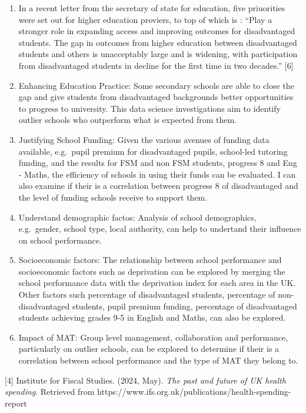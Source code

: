 \documentclass[
  letterpaper,
  DIV=11,
  numbers=noendperiod]{scrartcl}
\begin{document}
\begin{enumerate}
\def\labelenumi{\arabic{enumi}.}
\item
  In a recent letter from the secretary of state for education, five
  priuorities were set out for higher education proviers, to top of
  which is : ``Play a stronger role in expanding access and improving
  outcomes for disadvantaged students. The gap in outcomes from higher
  education between disadvantaged students and others is unacceptably
  large and is widening, with participation from disadvantaged students
  in decline for the first time in two decades.'' {[}6{]}
\item
  Enhancing Education Practice: Some secondary schools are able to close
  the gap and give students from disadvantaged backgrounds better
  opportunities to progress to university. This data science
  investigations aim to identify outlier schools who outperform what is
  expected from them.
\item
  Justifying School Funding: Given the various avenues of funding data
  available, e.g.~pupil premium for disadvantaged pupils, school-led
  tutoring funding, and the results for FSM and non FSM students,
  progress 8 and Eng - Maths, the efficiency of schools in using their
  funds can be evaluated. I can also examine if their is a correlation
  between progress 8 of disadvantaged and the level of funding schools
  receive to support them.
\item
  Understand demographic factos: Analysis of school demographics,
  e.g.~gender, school type, local authority, can help to undertand their
  influence on school performance.
\item
  Socioeconomic factors: The relationship between school performance and
  socioeconomic factors such as deprivation can be explored by merging
  the school performance data with the deprivation index for each area
  in the UK. Other factors such percentage of disadvantaged students,
  percentage of non-disadvantaged students, pupil premium funding,
  percentage of disadvantaged students achieving grades 9-5 in English
  and Maths, can also be explored.
\item
  Impact of MAT: Group level management, collaboration and performance,
  particularly on outlier schools, can be explored to determine if their
  is a correlation between school performance and the type of MAT they
  belong to.
\end{enumerate}

{[}4{]} Institute for Fiscal Studies. (2024, May). \emph{The past and
future of UK health spending}. Retrieved from
https://www.ifs.org.uk/publications/health-spending-report
\end{document}
